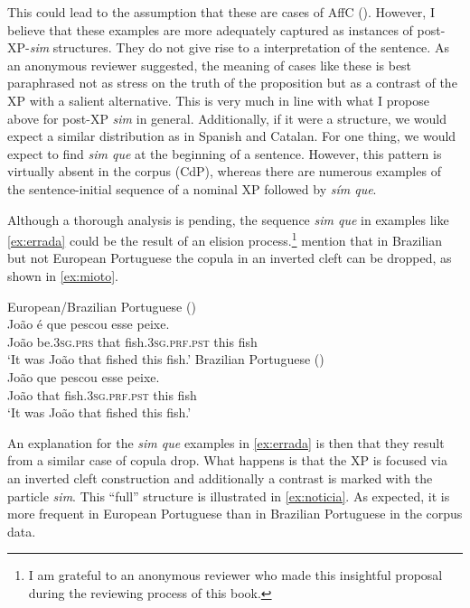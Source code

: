 This could lead to the assumption that these are  cases of AffC (\citealt{Kocher2019}). However, I believe that these examples are  more adequately captured as instances of post-XP-\emph{sim} structures. They do not give rise to a  interpretation of the sentence. As an anonymous reviewer suggested,   the meaning of cases like these is best paraphrased not as stress on the truth of the proposition but as a contrast of the XP with a salient alternative. This is very much in line with what I propose above for post-XP \emph{sim} in general.  Additionally, if it were a  structure, we would expect  a similar distribution as  in Spanish and Catalan. For one thing, we would expect to find \emph{sim que} at the beginning of a sentence. However, this pattern is virtually absent in the corpus (CdP), whereas there are numerous examples of the sentence-initial sequence of a nominal XP followed by \emph{sím que}.


Although a thorough analysis is pending, the sequence  \emph{sim que} in examples like \eqref{ex:errada} could be the result of an elision process.\footnote{I am grateful to an anonymous reviewer who made this insightful proposal during the reviewing process of this book.}  \citet{Mioto2016} mention  that in Brazilian but not European Portuguese the copula in an inverted cleft can be dropped, as shown in \eqref{ex:mioto}.

\ea\label{ex:mioto}
\ea\label{ex:miotofull} European/Brazilian Portuguese (\citealt[287: ex 42c]{Mioto2016})\\  \gll
João é que pescou esse peixe.\\
João be.\textsc{3sg.prs} that fish.\textsc{3sg.prf.pst} this fish\\
\glt `It was João that fished this fish.' 
\ex\label{ex:miotodrop} Brazilian Portuguese (\citealt[287: ex 43a]{Mioto2016})\\  \gll
João  que pescou esse peixe.\\
João  that fish.\textsc{3sg.prf.pst} this fish\\
\glt `It was João that fished this fish.' 
\z 
\z 

An explanation for the \emph{sim que} examples  in \eqref{ex:errada}  is  then that they result from a similar case of copula drop.  What happens is that the XP is focused via an inverted cleft construction and additionally a contrast is marked with the particle \emph{sim}. This ``full'' structure is  illustrated in \eqref{ex:noticia}.  As expected, it is more frequent in European Portuguese  than in Brazilian Portuguese in the corpus data.

